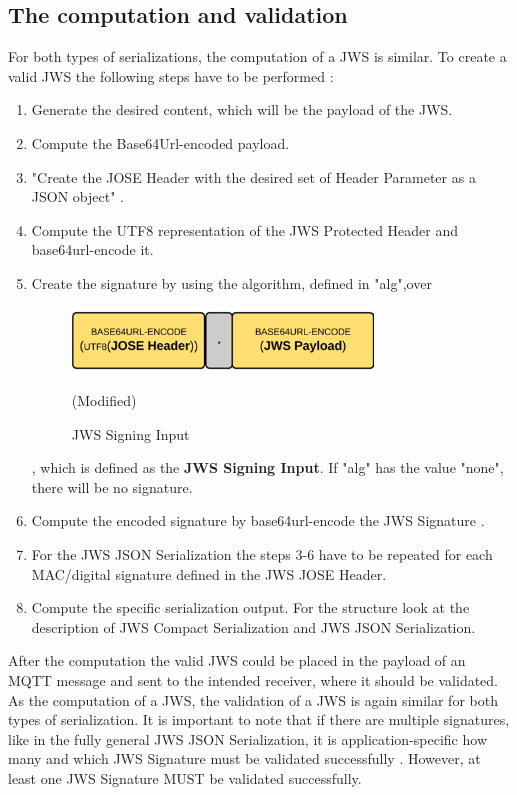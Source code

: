 \subsection{The computation and validation }
For both types of serializations, the computation of a JWS is similar. To create a valid JWS the following steps have to be performed \cite{rfc7515}: 
\begin{enumerate} [leftmargin=1cm,rightmargin=1cm]\itemsep0.2em
\item Generate the desired content, which will be the payload of the JWS.
\item Compute the Base64Url-encoded payload. 
\item "Create the JOSE Header with the desired set of Header Parameter as a JSON object" \cite{rfc7515}.
\item Compute the UTF8 representation of the JWS Protected Header and base64url-encode it.
\item Create the signature by using the algorithm, defined in "alg",\newline over 
\begin{figure}
\centering
\includegraphics[width=8cm]{Pages/JWS/SigningInput.png}
\caption{JWS Signing Input}\cite{Compact} (Modified)
\end{figure}
, which is defined as the \textbf{JWS Signing Input}. If "alg" has the value "none", there will be no signature.
\item Compute the encoded signature by base64url-encode the JWS Signature .
\item For the JWS JSON Serialization the steps 3-6 have to be repeated for each MAC/digital signature defined in the JWS JOSE Header.
\item Compute the specific serialization output. For the structure look at the description of JWS Compact Serialization and JWS JSON Serialization.
\end{enumerate} 
After the computation the valid JWS could be placed in the payload of an MQTT message and sent to the intended receiver, where it should be validated.
As the computation of a JWS, the validation of a JWS is again similar for both types of serialization. It is important to note that if there are multiple signatures, like in the fully general JWS JSON Serialization,  it is application-specific how many and which JWS Signature must be validated successfully \cite{rfc7515}. However, at least one JWS Signature MUST be validated successfully.
